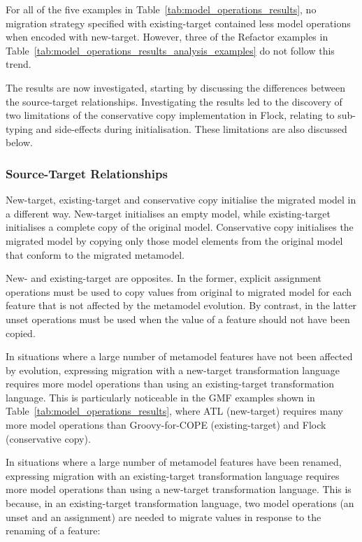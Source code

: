 For all of the five examples in Table~\ref{tab:model_operations_results}, no migration strategy specified with existing-target contained less model operations when encoded with new-target. However, three of the Refactor examples in Table~\ref{tab:model_operations_results_analysis_examples} do not follow this trend.

The results are now investigated, starting by discussing the differences between the source-target relationships. Investigating the results led to the discovery of two limitations of the conservative copy implementation in Flock, relating to sub-typing and side-effects during initialisation. These limitations are also discussed below.

\subsubsection{Source-Target Relationships}
New-target, existing-target and conservative copy initialise the migrated model in a different way. New-target initialises an empty model, while existing-target initialises a complete copy of the original model. Conservative copy initialises the migrated model by copying only those model elements from the original model that conform to the migrated metamodel.

New- and existing-target are opposites. In the former, explicit assignment operations must be used to copy values from original to migrated model for each feature that is not affected by the metamodel evolution. By contrast, in the latter unset operations must be used when the value of a feature should not have been copied.

In situations where a large number of metamodel features have not been affected by evolution, expressing migration with a new-target transformation language requires more model operations than using an existing-target transformation language. This is particularly noticeable in the GMF examples shown in Table~\ref{tab:model_operations_results}, where ATL (new-target) requires many more model operations than Groovy-for-COPE (existing-target) and Flock (conservative copy).

In situations where a large number of metamodel features have been renamed, expressing migration with an existing-target transformation language requires more model operations than using a new-target transformation language. This is because, in an existing-target transformation language, two model operations (an unset and an assignment) are needed to migrate values in response to the renaming of a feature:

